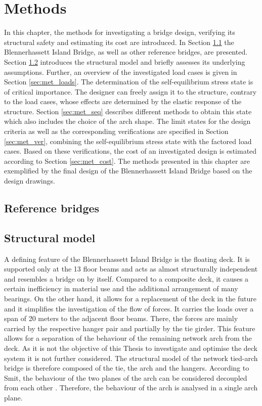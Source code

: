 \section{Methods}\label{sec:methods}
In this chapter, the methods for investigating a bridge design, verifying its structural safety and estimating its cost are introduced. In Section \ref{sec:met_ref} the Blennerhassett Island Bridge, as well as other reference bridges, are presented.
Section \ref{sec:met_str} introduces the structural model and briefly assesses its underlying assumptions. Further, an overview of the investigated load cases is given in Section \ref{sec:met_loads}. The determination of the self-equilibrium stress state is of critical importance. The designer can freely assign it to the structure, contrary to the load cases, whose effects are determined by the elastic response of the structure. Section \ref{sec:met_seq} describes different methods to obtain this state which also includes the choice of the arch shape. The limit states for the design criteria as well as the corresponding verifications are specified in Section \ref{sec:met_ver}, combining the self-equilibrium stress state with the factored load cases. Based on these verifications, the cost of an investigated design is estimated according to Section \ref{sec:met_cost}. The methods presented in this chapter are exemplified by the final design of the Blennerhassett Island Bridge based on the design drawings.

\subsection{Reference bridges} \label{sec:met_ref}

\newpage
\subsection{Structural model} \label{sec:met_str}
A defining feature of the Blennerhassett Island Bridge is the floating deck. It is supported only at the 13 floor beams and acts as almost structurally independent and resembles a bridge on by itself. Compared to a composite deck, it causes a certain inefficiency in material use and the additional arrangement of many bearings. On the other hand, it allows for a replacement of the deck in the future and it simplifies the investigation of the flow of forces. It carries the loads over a span of 20 meters to the adjacent floor beams. There, the forces are mainly carried by the respective hanger pair and partially by the tie girder. This feature allows for a separation of the behaviour of the remaining network arch from the deck. As it is not the objective of this Thesis to investigate and optimise the deck system it is not further considered. The structural model of the network tied-arch bridge is therefore composed of the tie, the arch and the hangers. According to Smit, the behaviour of the two planes of the arch can be considered decoupled from each other \citep{Smit}. Therefore, the behaviour of the arch is analysed in a single arch plane.\medskip

